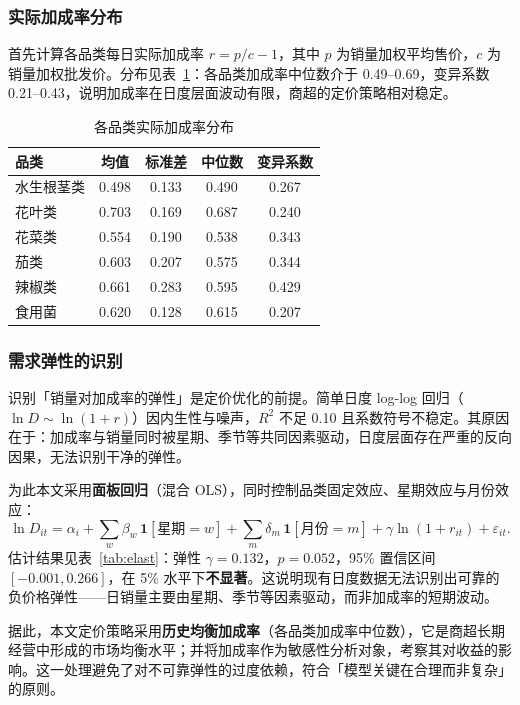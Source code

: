 \documentclass[12pt]{ctexart}
\begin{document}
\subsubsection{实际加成率分布}
首先计算各品类每日实际加成率 $r = p/c - 1$，其中 $p$ 为销量加权平均售价，$c$ 为销量加权批发价。分布见表~\ref{tab:markup}：各品类加成率中位数介于 0.49--0.69，变异系数 0.21--0.43，说明加成率在日度层面波动有限，商超的定价策略相对稳定。

\begin{table}[htbp]
\centering
\caption{各品类实际加成率分布}
\label{tab:markup}
\begin{tabular}{lcccc}
\toprule
品类 & 均值 & 标准差 & 中位数 & 变异系数 \\
\midrule
水生根茎类 & 0.498 & 0.133 & 0.490 & 0.267 \\
花叶类 & 0.703 & 0.169 & 0.687 & 0.240 \\
花菜类 & 0.554 & 0.190 & 0.538 & 0.343 \\
茄类 & 0.603 & 0.207 & 0.575 & 0.344 \\
辣椒类 & 0.661 & 0.283 & 0.595 & 0.429 \\
食用菌 & 0.620 & 0.128 & 0.615 & 0.207 \\
\bottomrule
\end{tabular}
\end{table}

\subsubsection{需求弹性的识别}
识别「销量对加成率的弹性」是定价优化的前提。简单日度 log-log 回归（$\ln D \sim \ln(1+r)$）因内生性与噪声，$R^2$ 不足 0.10 且系数符号不稳定。其原因在于：加成率与销量同时被星期、季节等共同因素驱动，日度层面存在严重的反向因果，无法识别干净的弹性。

为此本文采用\textbf{面板回归}（混合 OLS），同时控制品类固定效应、星期效应与月份效应：
\begin{equation}
\ln D_{it} = \alpha_i + \sum_{w}\beta_w\,\mathbf{1}[\text{星期}=w] + \sum_{m}\delta_m\,\mathbf{1}[\text{月份}=m] + \gamma\ln(1+r_{it}) + \varepsilon_{it}.
\end{equation}
估计结果见表~\ref{tab:elast}：弹性 $\gamma=0.132$，$p=0.052$，95\% 置信区间 $[-0.001, 0.266]$，在 5\% 水平下\textbf{不显著}。这说明现有日度数据无法识别出可靠的负价格弹性——日销量主要由星期、季节等因素驱动，而非加成率的短期波动。

据此，本文定价策略采用\textbf{历史均衡加成率}（各品类加成率中位数），它是商超长期经营中形成的市场均衡水平；并将加成率作为敏感性分析对象，考察其对收益的影响。这一处理避免了对不可靠弹性的过度依赖，符合「模型关键在合理而非复杂」的原则。
\end{document}
